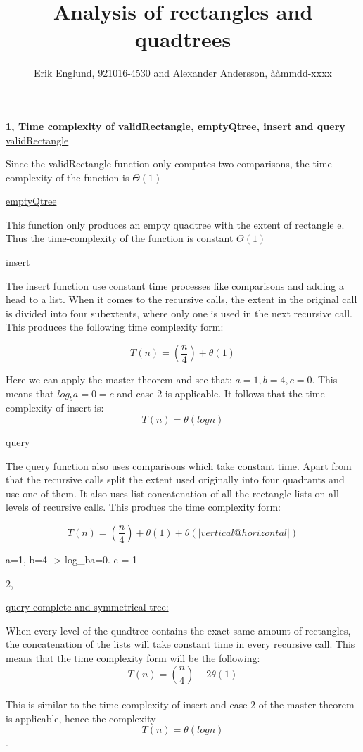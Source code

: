 \documentclass[12pt, a4paper]{article}
\title{Analysis of rectangles and quadtrees}
\author{Erik Englund, 921016-4530 and Alexander Andersson, ååmmdd-xxxx}
\begin{document}
\maketitle

\textbf{1, Time complexity of validRectangle, emptyQtree, insert and query}\\

\underline{validRectangle}

Since the validRectangle function only computes two comparisons, the time-complexity of the function is 
$\Theta(1)$




\underline{emptyQtree}

This function only produces an empty quadtree with the extent of rectangle e. Thus the time-complexity of the function is constant $\Theta(1)$



\underline{insert}

The insert function use constant time processes like comparisons and adding a head to a list. When it comes to the recursive calls, the extent in the original call is divided into four subextents, where only one is used in the next recursive call. This produces the following time complexity form:

$$T(n)=\left(\frac{n}{4}\right)+\theta(1)$$

Here we can apply the master theorem and see that: $a=1, b=4, c=0$. This means that $log_ba=0 = c$ and case 2 is applicable. It follows that the time complexity of insert is: $$T(n)=\theta(log n)$$





\underline{query}

The query function also uses comparisons which take constant time. Apart from that the recursive calls split the extent used originally into four quadrants and use one of them. It also uses list concatenation of all the rectangle lists on all levels of recursive calls. This produes the time complexity form:

$$T(n)=\left(\frac{n}{4}\right)+\theta(1)+\theta(|vertical@horizontal|)$$

a=1, b=4 -> log_ba=0. c = 1

2,

\underline{query complete and symmetrical tree:}

When every level of the quadtree contains the exact same amount of rectangles, the concatenation of the lists will take constant time in every recursive call. This means that the time complexity form will be the following: $$T(n)=\left(\frac{n}{4}\right)+2\theta(1)$$\\

This is similar to the time complexity of insert and case 2 of the master theorem is applicable, hence the complexity $$T(n)=\theta(log n)$$.
\end{document}
